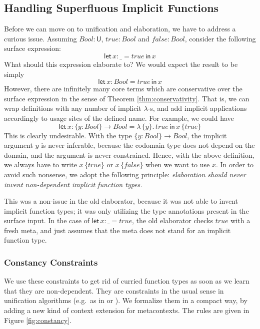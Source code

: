 \documentclass[acmsmall,screen,dvipsnames]{acmart}\settopmatter{}
\newcommand{\slet}{\boldsymbol{\mathsf{let}}}
\renewcommand{\sin}{\boldsymbol{\mathsf{in}}}
\renewcommand{\U}{\mathsf{U}}
\newcommand{\mi}[1]{\mathit{#1}}
\theoremstyle{remark}
\begin{document}
\subsection{Handling Superfluous Implicit Functions}\label{sec:superfluous}

Before we can move on to unification and elaboration, we have to address
a curious issue. Assuming $\mi{Bool} : \U$, $\mi{true} : \mi{Bool}$ and $\mi{false} : \mi{Bool}$,
consider the following surface expression:
\[
  \slet\,x : \_ = \mi{true}\,\sin\,x
\]
What should this expression elaborate to? We would expect the result to be simply
\[
  \slet\,x : \mi{Bool} = \mi{true}\,\sin\,x
\]
However, there are infinitely many core terms which are conservative over the
surface expression in the sense of Theorem \ref{thm:conservativity}. That is, we
can wrap definitions with any number of implicit $\lambda$-s, and add implicit
applications accordingly to usage sites of the defined name. For example, we could have
\[
  \slet\,x : \{y : \mi{Bool}\} \to \mi{Bool} = \lambda\,\{y\}.\,\mi{true}\,\sin\,x\,\{\mi{true}\}
\]
This is clearly undesirable. With the type $\{y : Bool\} \to Bool$, the implicit
argument $y$ is never inferable, because the codomain type does not depend on
the domain, and the argument is never constrained. Hence, with the above
definition, we always have to write $x\,\{\mi{true}\}$ or $x\,\{\mi{false}\}$ when we want
to use $x$. In order to avoid such nonsense, we adopt the following principle:
\emph{elaboration should never invent non-dependent implicit function types.}

This was a non-issue in the old elaborator, because it was not able to invent
implicit function types; it was only utilizing the type annotations present in
the surface input. In the case of $\slet\,x : \_ = \mi{true}$, the old elaborator
checks $\mi{true}$ with a fresh meta, and just assumes that the meta does not stand
for an implicit function type.

\subsubsection{Constancy Constraints}
We use these constraints to get rid of curried function types as soon as we
learn that they are non-dependent. They are constraints in the usual sense in
unification algorithms (e.g.\ as in \cite{abel2011higher} or
\cite{vytiniotis2011outsidein}). We formalize them in a compact way, by adding a
new kind of context extension for metacontexts. The rules are given in Figure
\ref{fig:constancy}.
\end{document}

